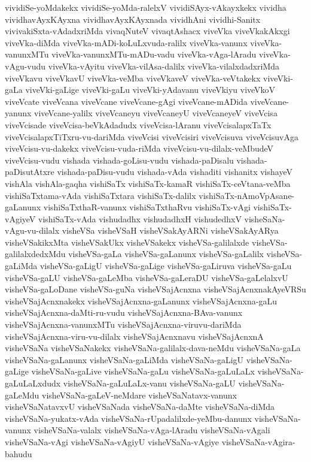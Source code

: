 {vividiSe-yoMdakekx
vividiSe-yoMda-ralelxV
vividiSAyx-vAkayxkekx
vividha
vividhavAyxKAyxna
vividhavAyxKAyxnada
vividhAni
vividhi-Sanitx
vivivakiSxta-vAdadxriMda
vivaqNuteV
vivaqtAshacx
viveVka
viveVkakAkxgi
viveVka-diMda
viveVka-mADi-koLuLxvuda-ralilx
viveVka-vanunx
viveVka-vanunxMTu
viveVka-vanunxMTu-mADu-vadu
viveVka-vAga-lAradu
viveVka-vAgu-vudu
viveVka-vAyitu
viveVka-vilAsa-dalilx
viveVka-vilalxdadxriMda
viveVkavu
viveVkavU
viveVka-veMba
viveVkaveV
viveVka-veVtakekx
viveVki-gaLa
viveVki-gaLige
viveVki-gaLu
viveVki-yAdavanu
viveVkiyu
viveVkoV
viveVcate
viveVcana
viveVcane
viveVcane-gAgi
viveVcane-mADida
viveVcane-yanunx
viveVcane-yalilx
viveVcaneyu
viveVcaneyU
viveVcaneyeV
viveVcisa
viveVcisade
viveVcisa-beVkAdadudx
viveVcisa-lAranu
viveVcisalapxTaTx
viveVcisalapxTiTxru-vu-dariMda
viveVcisi
viveVcisiri
viveVcisuva
viveVcisuvAga
viveVcisu-vu-dakekx
viveVcisu-vuda-riMda
viveVcisu-vu-dilalx-veMbudeV
viveVcisu-vudu
vishada
vishada-goLisu-vudu
vishada-paDisalu
vishada-paDisutAtxre
vishada-paDisu-vudu
vishada-vAda
vishaditi
vishanitx
vishayeV
vishAla
vishAla-gaqha
vishiSaTx
vishiSaTx-kamaR
vishiSaTx-ceVtana-veMba
vishiSaTxtama-vAda
vishiSaTxtara
vishiSaTx-dalilx
vishiSaTx-nAmoVpAsane-gaLanunx
vishiSaTxthaR-vanunx
vishiSaTxthaRvu
vishiSaTx-vAgi
vishiSaTx-vAgiyeV
vishiSaTx-vAda
vishudadhx
vishudadhxH
vishudedhxV
visheSaNa-vAgu-vu-dilalx
visheVSa
visheVSaH
visheVSakAyARNi
visheVSakAyARya
visheVSakikxMta
visheVSakUkx
visheVSakekx
visheVSa-galilalxde
visheVSa-galilalxdedxMdu
visheVSa-gaLa
visheVSa-gaLanunx
visheVSa-gaLalilx
visheVSa-gaLiMda
visheVSa-gaLigU
visheVSa-gaLige
visheVSa-gaLiruva
visheVSa-gaLu
visheVSa-gaLU
visheVSa-gaLeMba
visheVSa-gaLeraDU
visheVSa-gaLelalxvU
visheVSa-gaLoDane
visheVSa-guNa
visheVSajAcnxna
visheVSajAcnxnakAyeVRSu
visheVSajAcnxnakekx
visheVSajAcnxna-gaLanunx
visheVSajAcnxna-gaLu
visheVSajAcnxna-daMti-ru-vudu
visheVSajAcnxna-BAva-vanunx
visheVSajAcnxna-vanunxMTu
visheVSajAcnxna-viruvu-dariMda
visheVSajAcnxna-viru-vu-dilalx
visheVSajAcnxnavu
visheVSajAcnxnA
visheVSaNa
visheVSaNakekx
visheVSaNa-galilalx-dava-neMdu
visheVSaNa-gaLa
visheVSaNa-gaLanunx
visheVSaNa-gaLiMda
visheVSaNa-gaLigU
visheVSaNa-gaLige
visheVSaNa-gaLive
visheVSaNa-gaLu
visheVSaNa-gaLuLaLx
visheVSaNa-gaLuLaLxdudx
visheVSaNa-gaLuLaLx-vanu
visheVSaNa-gaLU
visheVSaNa-gaLeMdu
visheVSaNa-gaLeV-neMdare
visheVSaNatavx-vanunx
visheVSaNatavxvU
visheVSaNada
visheVSaNa-daMte
visheVSaNa-diMda
visheVSaNa-yukatx-vAda
visheVSaNa-rUpadalilxde-yeMbu-danunx
visheVSaNa-vanunx
visheVSaNa-valalx
visheVSaNa-vAga-lAradu
visheVSaNa-vAgali
visheVSaNa-vAgi
visheVSaNa-vAgiyU
visheVSaNa-vAgiye
visheVSaNa-vAgira-bahudu
}
